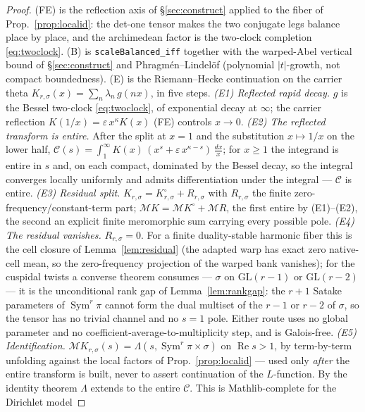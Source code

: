 \documentclass[11pt]{article}
\theoremstyle{definition}
\renewcommand{\Re}{\operatorname{Re}}
\newcommand{\Sym}{\operatorname{Sym}}
\begin{document}
\begin{proof}
\textup{(FE)} is the reflection axis of \S\ref{sec:construct} applied to the fiber of
Prop.~\ref{prop:localid}: the det-one tensor makes the two conjugate legs balance place by place, and the
archimedean factor is the two-clock completion \eqref{eq:twoclock}. \textup{(B)} is
\texttt{scaleBalanced\_iff} together with the warped-Abel vertical bound of \S\ref{sec:construct} and
Phragm\'en--Lindel\"of (polynomial $|t|$-growth, not compact boundedness).
\textup{(E)} is the Riemann--Hecke continuation on the carrier theta $K_{r,\sigma}(x)=\sum_n\lambda_n\,g(nx)$,
in five steps.
\emph{(E1) Reflected rapid decay.} $g$ is the Bessel two-clock \eqref{eq:twoclock}, of exponential decay at
$\infty$; the carrier reflection $K(1/x)=\varepsilon\,x^{\kappa}K(x)$ \textup{(FE)} controls $x\to0$.
\emph{(E2) The reflected transform is entire.} After the split at $x=1$ and the substitution $x\mapsto1/x$
on the lower half, $\mathcal C(s)=\int_1^\infty K(x)\,(x^{s}+\varepsilon\,x^{\kappa-s})\,\tfrac{dx}{x}$; for
$x\ge1$ the integrand is entire in $s$ and, on each compact, dominated by the Bessel decay, so the integral
converges locally uniformly and admits differentiation under the integral --- $\mathcal C$ is entire.
\emph{(E3) Residual split.} $K_{r,\sigma}=K^\circ_{r,\sigma}+R_{r,\sigma}$ with $R_{r,\sigma}$ the finite
zero-frequency/constant-term part; $\mathcal M K=\mathcal M K^\circ+\mathcal M R$, the first entire by
\textup{(E1)--(E2)}, the second an explicit finite meromorphic sum carrying every possible pole.
\emph{(E4) The residual vanishes.} $R_{r,\sigma}=0$. For a finite duality-stable harmonic fiber this is the
cell closure of Lemma~\ref{lem:residual} (the adapted warp has exact zero native-cell mean, so the
zero-frequency projection of the warped bank vanishes); for the cuspidal twists a converse theorem consumes
--- $\sigma$ on $\mathrm{GL}(r-1)$ or $\mathrm{GL}(r-2)$ --- it is the unconditional rank gap of
Lemma~\ref{lem:rankgap}: the $r+1$ Satake parameters of $\Sym^r\pi$ cannot form the dual multiset of the
$r-1$ or $r-2$ of $\sigma$, so the tensor has no trivial channel and no $s=1$ pole. Either route uses no
global parameter and no coefficient-average-to-multiplicity step, and is Galois-free.
\emph{(E5) Identification.} $\mathcal M K_{r,\sigma}(s)=\Lambda(s,\Sym^r\pi\times\sigma)$ on $\Re s>1$, by
term-by-term unfolding against the local factors of Prop.~\ref{prop:localid} --- used only \emph{after} the
entire transform is built, never to assert continuation of the $L$-function. By the identity theorem
$\Lambda$ extends to the entire $\mathcal C$. This is Mathlib-complete for the Dirichlet model

\end{proof}
\end{document}
